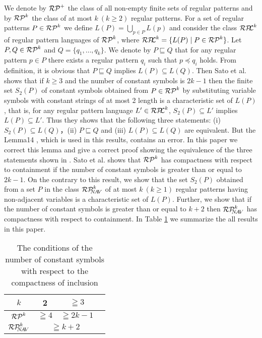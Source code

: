We denote by $\mathcal{RP}^{+}$ the class of all non-empty finite sets of regular patterns and
by $\mathcal{RP}^{k}$ the class of at most $k~(k\geq 2)$ regular patterns.
For a set of regular patterns $P\in\mathcal{RP}^{k}$ we define $L(P)=\bigcup_{p\in P}L(p)$ and consider the class $\mathcal{RP\!\!L}^{k}$ of regular pattern languages of $\mathcal{RP}^{k}$, where $\mathcal{RP\!\!L}^{k} = \{L(P) \mid P\in \mathcal{RP}^{k}\}$.
Let $P,Q\in \mathcal{RP}^{k}$ and $Q= \{ q_{1}, \ldots, q_{k} \}$.
We denote by $P\sqsubseteq Q$ that for any regular pattern $p\in P$ there exists a regular pattern $q_{i}$ such that $p\preceq q_{i}$ holds.
From definition, it is obvious that $P \sqsubseteq Q$ implies $L(P)\subseteq L(Q)$.
%
Then Sato et al.\cite{Sato1} shows that 
if $k \ge 3$ and the number of constant symbols is $2k-1$ then 
the finite set $S_2(P)$ of constant symbols obtained from $P\in \mathcal{RP}^{k}$ by substituting variable symbols with constant strings of at most 2 length is a characteristic set of $L(P)$, 
that is, for any regular pattern language $L'\in \mathcal{RP\!\!L}^{k}$, $S_2(P) \subseteq L'$ implies $L(P)\subseteq L'$.
Thus they shows that the following three statements: (i) $S_2(P) \subseteq L(Q)$，(ii) $P\sqsubseteq Q$ and (iii) $L(P)\subseteq L(Q)$ are equivalent. 
%
But the Lemma14 \cite{Sato1}, which is used in this results, contains an error.
In this paper we correct this lemma and give a correct proof showing the equivalence of the three statements shown in \cite{Sato1}.
Sato et al.\cite{Sato1} shows that $\mathcal{RP}^{k}$ has compactness with respect to containment if the number of constant symbols is greater than or equal to $2k-1$.
On the contrary to this result, we show that the set $S_2(P)$ obtained from a set $P$ in the class $\mathcal{RP}^{k}_{\!\!\!N\!A\!V}$ of at most $k~(k\ge 1)$ regular patterns having non-adjacent variables is a characteristic set of $L(P)$.
Further, we show that if the number of constant symbols is greater than or equal to $k+2$ then $\mathcal{RP}^{k}_{\!\!\!N\!A\!V}$ has compactness with respect to containment.
In Table \ref{table1} we summarize the all results in this paper.


\begin{table}[hbt]
\begin{center}
\vspace{-0.4cm}
\caption{The conditions of the number of constant symbols with respect to the compactness of inclusion}
\label{table1}
\begin{tabular}{llll}
\hline
\multicolumn{1}{|c|}{$k$}   & \multicolumn{1}{c|}{2}                            & \multicolumn{1}{c|}{$ \geqq 3$} \\ 
\hline
\hline
\multicolumn{1}{|c|}{$\mathcal{RP}^{k}$} & \multicolumn{1}{c|}{$ \geqq 4$}                          & \multicolumn{1}{c|}{$ \geqq 2k-1$} \\ \hline
\multicolumn{1}{|c|}{$\mathcal{RP}^{k}_{\!\!\!N\!A\!V}$} & \multicolumn{2}{c|}{$ \geqq k+2$} \\ \hline
\end{tabular}
\end{center}
\end{table}

